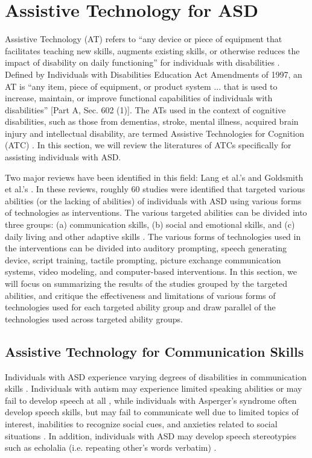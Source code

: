 \section{Assistive Technology for ASD}
Assistive Technology (AT) refers to ``any device or piece of equipment that facilitates teaching new skills, augments existing skills, or otherwise reduces the impact of disability on daily functioning'' for individuals with disabilities \cite{lang2014assistive}.  Defined by Individuals with Disabilities Education Act Amendments of 1997, an AT is ``any item, piece of equipment, or product system ... that is used to increase, maintain, or improve functional capabilities of individuals with disabilities'' [Part A, Sec. 602 (1)].  The ATs used in the context of cognitive disabilities, such as those from dementias, stroke, mental illness, acquired brain injury and intellectual disability, are termed Assistive Technologies for Cognition (ATC) \cite{frank2004assistive}.  In this section, we will review the literatures of ATCs specifically for assisting individuals with ASD.

Two major reviews have been identified in this field: Lang et al.'s \cite{lang2014assistive} and Goldsmith et al.'s \cite{goldsmith2004use}.  In these reviews, roughly 60 studies were identified that targeted various abilities (or the lacking of abilities) of individuals with ASD using various forms of technologies as interventions.  The various targeted abilities can be divided into three groups: (a) communication skills, (b) social and emotional skills, and (c) daily living and other adaptive skills \cite{lang2014assistive}.  The various forms of technologies used in the interventions can be divided into auditory prompting, speech generating device, script training, tactile prompting, picture exchange communication systems, video modeling, and computer-based interventions.  In this section, we will focus on summarizing the results of the studies grouped by the targeted abilities, and critique the effectiveness and limitations of various forms of technologies used for each targeted ability group and draw parallel of the technologies used across targeted ability groups.

\subsection{Assistive Technology for Communication Skills}
Individuals with ASD experience varying degrees of disabilities in communication skills \cite{howlin2003outcome}.  Individuals with autism may experience limited speaking abilities or may fail to develop speech at all \cite{weitz1997aac}, while individuals with Asperger's syndrome often develop speech skills, but may fail to communicate well due to limited topics of interest, inabilities to recognize social cues, and anxieties related to social situations \cite{scheuermann2002teaching}.  In addition, individuals with ASD may develop speech stereotypies such as echolalia (i.e. repeating other's words verbatim) \cite{sigafoos2007assessing}.

